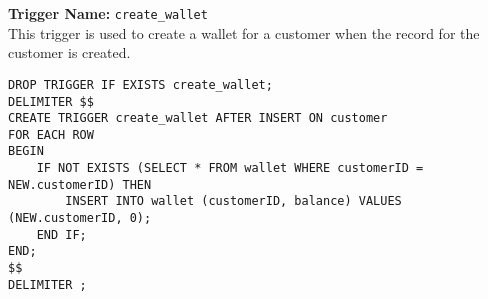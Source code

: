 \textbf{Trigger Name:} \texttt{create\_wallet} \\
This trigger is used to create a wallet for a customer when the record for the customer is created.

\begin{lstlisting}
DROP TRIGGER IF EXISTS create_wallet;
DELIMITER $$
CREATE TRIGGER create_wallet AFTER INSERT ON customer
FOR EACH ROW
BEGIN
    IF NOT EXISTS (SELECT * FROM wallet WHERE customerID = NEW.customerID) THEN
        INSERT INTO wallet (customerID, balance) VALUES (NEW.customerID, 0);
    END IF;
END;
$$
DELIMITER ;
\end{lstlisting}